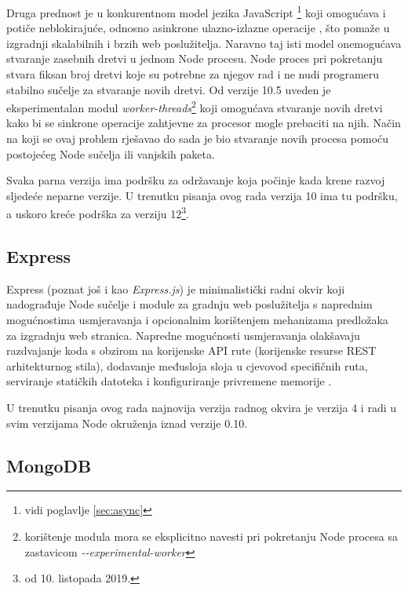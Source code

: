 \documentclass[times, utf8, diplomski, numeric]{fer}
\newcommand{\razmaks}{\vspace{10pt}}
\begin{document}
Druga prednost je u konkurentnom model jezika JavaScript \footnote{vidi poglavlje \ref{sec:async}} koji omogućava i potiče neblokirajuće, odnosno asinkrone ulazno-izlazne operacije , što pomaže u izgradnji skalabilnih i brzih web poslužitelja.
Naravno taj isti model onemogućava stvaranje zasebnih dretvi u jednom Node procesu. Node proces pri pokretanju stvara fiksan broj dretvi koje su potrebne za njegov rad i ne nudi programeru stabilno sučelje za stvaranje novih dretvi.
Od verzije 10.5 uveden je eksperimentalan modul \emph{worker-threads}\footnote{
    korištenje modula mora se eksplicitno navesti pri pokretanju Node procesa sa zastavicom \emph{-{}-experimental-worker}
} koji omogućava stvaranje novih dretvi kako bi se sinkrone operacije zahtjevne za procesor  mogle prebaciti na njih.
Način na koji se ovaj problem rješavao do sada je bio stvaranje novih procesa pomoću postojećeg Node sučelja ili vanjskih paketa\citep{art_node}.

Svaka parna verzija ima podršku za održavanje  koja počinje kada krene razvoj sljedeće neparne verzije.
U trenutku pisanja ovog rada verzija 10 ima tu podršku, a uskoro kreće podrška za verziju 12\footnote{od 10. listopada 2019.}\citep{wiki_node}.


\newpage
\subsection{Express}

Express (poznat još i kao \emph{Express.js}) je minimalistički radni okvir  koji nadograđuje Node sučelje i module za gradnju web poslužitelja s naprednim mogućnostima usmjeravanja  i opcionalnim korištenjem mehanizama predložaka  za izgradnju web stranica.
Napredne mogućnosti usmjeravanja olakšavaju razdvajanje koda s obzirom na korijenske API rute (korijenske resurse REST arhitekturnog stila), dodavanje međusloja sloja  u cjevovod  specifičnih ruta, serviranje statičkih datoteka i konfiguriranje privremene memorije .

U trenutku pisanja ovog rada najnovija verzija radnog okvira je verzija 4 i radi u svim verzijama Node okruženja iznad verzije 0.10\citep{gh_express}.


\razmaks
\subsection{MongoDB} \label{sec:mongo}
\end{document}
